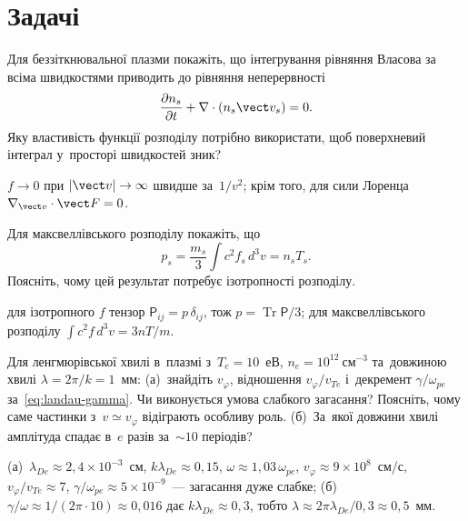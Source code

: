 \section*{Задачі}

\begin{problem}\label{prb:KineticMoments}
Для беззіткнювальної плазми покажіть, що інтегрування рівняння Власова за всіма
швидкостями приводить до рівняння неперервності
\begin{equation*}
\frac{\partial n_s}{\partial t}
+\nabla\cdot(n_s\vect v_s)=0.
\end{equation*}
Яку властивість функції розподілу потрібно використати, щоб поверхневий інтеграл
у~просторі швидкостей зник?
	\begin{solution}
		$f\to0$ при $|\vect v|\to\infty$ швидше за~$1/v^2$; крім того, для сили Лоренца $\nabla_{\vect v}\cdot\vect F=0$.
	\end{solution}
\end{problem}

\begin{problem}\label{prb:MaxwellPressure}
Для максвеллівського розподілу покажіть, що
\begin{equation*}
p_s=\frac{m_s}{3}\int c^2f_s\,d^3v
=n_sT_s.
\end{equation*}
Поясніть, чому цей результат потребує ізотропності розподілу.
	\begin{solution}
		для ізотропного $f$ тензор $\mathsf P_{ij}=p\,\delta_{ij}$, тож $p=\operatorname{Tr}\mathsf P/3$; для максвеллівського розподілу $\int c^2f\,d^3v=3nT/m$.
	\end{solution}
\end{problem}

\begin{problem}\label{prb:LandauResonance}
Для ленгмюрівської хвилі в~плазмі з~$T_e=10$~еВ, $n_e=10^{12}~\text{см}^{-3}$ та~довжиною хвилі
$\lambda=2\pi/k=1$~мм: (а)~знайдіть $v_\varphi$, відношення $v_\varphi/v_{Te}$ і~декремент $\gamma/\omega_{pe}$
за~\eqref{eq:landau-gamma}. Чи виконується умова слабкого загасання? Поясніть, чому саме
частинки з~$v\simeq v_\varphi$ відіграють особливу роль. (б)~За~якої довжини хвилі амплітуда
спадає в~$e$ разів за~$\sim10$ періодів?
	\begin{solution}
		(а)~$\lambda_{De}\approx2{,}4\times10^{-3}$~см, $k\lambda_{De}\approx0{,}15$, $\omega\approx1{,}03\,\omega_{pe}$,
$v_\varphi\approx9\times10^8$~см/с, $v_\varphi/v_{Te}\approx7$, $\gamma/\omega_{pe}\approx5\times10^{-9}$~--- загасання дуже слабке;
(б)~$\gamma/\omega\approx1/(2\pi\cdot10)\approx0{,}016$ дає $k\lambda_{De}\approx0{,}3$, тобто $\lambda\approx2\pi\lambda_{De}/0{,}3\approx0{,}5$~мм.
	\end{solution}
\end{problem}

